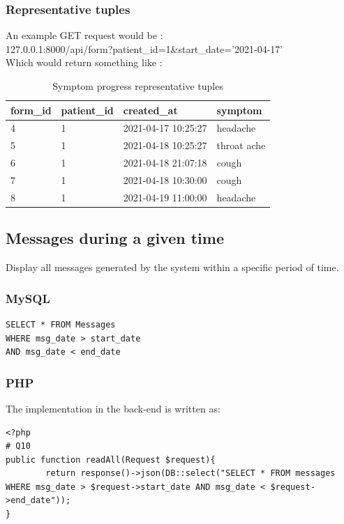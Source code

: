 \subsubsection{Representative tuples}
An example GET request would be : \\
127.0.0.1:8000/api/form?patient\_id=1\&start\_date='2021-04-17'\\
Which would return something like :
\begin{table}[ht]
\centering
\begin{tabular}{|l|l|l|l|} 
        \hline
        form\_id & patient\_id & created\_at & symptom \\
        \hline 
        4&1& 2021-04-17 10:25:27 & headache\\
        5&1 & 2021-04-18 10:25:27 & throat ache\\
        6&1 & 2021-04-18 21:07:18 & cough\\
        7&1 & 2021-04-18 10:30:00 & cough\\
        8&1 & 2021-04-19 11:00:00 & headache\\
        \hline
\end{tabular}
\caption{Symptom progress representative tuples}
\end{table}
\subsection{Messages during a given time} 
Display all messages generated by the system within a specific period of time.

\subsubsection{MySQL}
\begin{verbatim}
SELECT * FROM Messages 
WHERE msg_date > start_date 
AND msg_date < end_date
\end{verbatim}

\subsubsection{PHP}
The implementation in the back-end is written as:
\begin{verbatim}
<?php
# Q10
public function readAll(Request $request){
        return response()->json(DB::select("SELECT * FROM messages WHERE msg_date > $request->start_date AND msg_date < $request->end_date"));
}

\end{verbatim}

